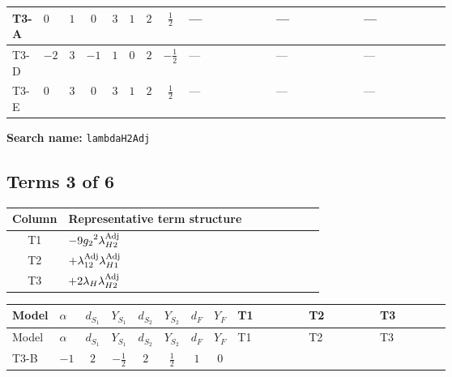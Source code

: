 \documentclass[8pt]{article}
\begin{document}
\begin{landscape}
\begin{longtable}{@{}llcccccc >{\raggedright\arraybackslash}p{0.21\linewidth} >{\raggedright\arraybackslash}p{0.21\linewidth} >{\raggedright\arraybackslash}p{0.21\linewidth}@{}}
\midrule
T3-A & $0$ & $1$ & $0$ & $3$ & $1$ & $2$ & $\frac{1}{2}$ & --- & --- & --- \\
\midrule
T3-D & $-2$ & $3$ & $-1$ & $1$ & $0$ & $2$ & $-\frac{1}{2}$ & --- & --- & --- \\
\midrule
T3-E & $0$ & $3$ & $0$ & $3$ & $1$ & $2$ & $\frac{1}{2}$ & --- & --- & --- \\
\midrule
\bottomrule
\end{longtable}
\clearpage
\noindent\textbf{Search name: }\texttt{lambdaH2Adj}\par\smallskip
\subsection*{Terms 3 of 6}
\begin{center}
\begin{tabular}{@{}c >{\raggedright\arraybackslash}p{0.82\linewidth}@{}}
\toprule
Column & Representative term structure \\
\midrule
T1 & \(\displaystyle -9 {g_2}^2 {\lambda_{H2}^{\rm Adj}}\) \\
\midrule
T2 & \(\displaystyle +{\lambda_{12}^{\rm Adj}} {\lambda_{H1}^{\rm Adj}}\) \\
\midrule
T3 & \(\displaystyle +2 {\lambda_H} {\lambda_{H2}^{\rm Adj}}\) \\
\midrule
\bottomrule
\end{tabular}
\end{center}
\smallskip
\tiny
\begin{longtable}{@{}llcccccc >{\raggedright\arraybackslash}p{0.21\linewidth} >{\raggedright\arraybackslash}p{0.21\linewidth} >{\raggedright\arraybackslash}p{0.21\linewidth}@{}}
\toprule
Model & $\alpha$ & $d_{S_1}$ & $Y_{S_1}$ & $d_{S_2}$ & $Y_{S_2}$ & $d_F$ & $Y_F$ & T1 & T2 & T3 \\
\midrule
\endfirsthead
\toprule
Model & $\alpha$ & $d_{S_1}$ & $Y_{S_1}$ & $d_{S_2}$ & $Y_{S_2}$ & $d_F$ & $Y_F$ & T1 & T2 & T3 \\
\midrule
\endhead
T3-B & $-1$ & $2$ & $-\frac{1}{2}$ & $2$ & $\frac{1}{2}$ & $1$ & $0$ & \scriptsize\adjustbox{max width=\linewidth}{$\begin{gathered} -9 {g_2}^2 {\lambda_{H2}^{\rm Adj}}\end{gathered}$} & \scriptsize\adjustbox{max width=\linewidth}{$\begin{gathered} +{\lambda_{12}^{\rm Adj}} {\lambda_{H1}^{\rm Adj}}\end{gathered}$} & \scriptsize\adjustbox{max width=\linewidth}{$\begin{gathered} +2 {\lambda_H} {\lambda_{H2}^{\rm Adj}}\end{gathered}$} \\

\end{longtable}
\end{landscape}
\end{document}
